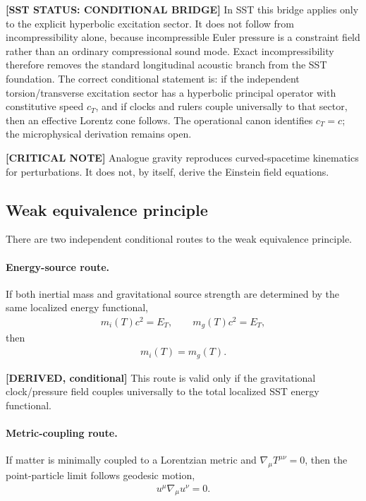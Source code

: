 \textbf{[SST STATUS: CONDITIONAL BRIDGE]} In SST this bridge applies only to the
explicit hyperbolic excitation sector. It does not follow from incompressibility
alone, because incompressible Euler pressure is a constraint field rather than
an ordinary compressional sound mode. Exact incompressibility therefore removes
the standard longitudinal acoustic branch from the SST foundation. The correct
conditional statement is: if the independent torsion/transverse excitation
sector has a hyperbolic principal operator with constitutive speed \(c_T\), and
if clocks and rulers couple universally to that sector, then an effective
Lorentz cone follows. The operational canon identifies \(c_T=c\); the
microphysical derivation remains open.

\textbf{[CRITICAL NOTE]} Analogue gravity reproduces curved-spacetime
kinematics for perturbations. It does not, by itself, derive the Einstein field
equations.

\subsection{Weak equivalence principle}

There are two independent conditional routes to the weak equivalence principle.

\paragraph{Energy-source route.}
If both inertial mass and gravitational source strength are determined by the
same localized energy functional,
\begin{align}
    m_i(T)c^2 = E_T,
    \qquad
    m_g(T)c^2 = E_T,
\end{align}
then
\begin{align}
    m_i(T)=m_g(T).
\end{align}

\textbf{[DERIVED, conditional]} This route is valid only if the gravitational
clock/pressure field couples universally to the total localized SST energy
functional.

\paragraph{Metric-coupling route.}
If matter is minimally coupled to a Lorentzian metric and
\(\nabla_\mu T^{\mu\nu}=0\), then the point-particle limit follows geodesic
motion,
\begin{align}
    u^\mu \nabla_\mu u^\nu =0 .
\end{align}

